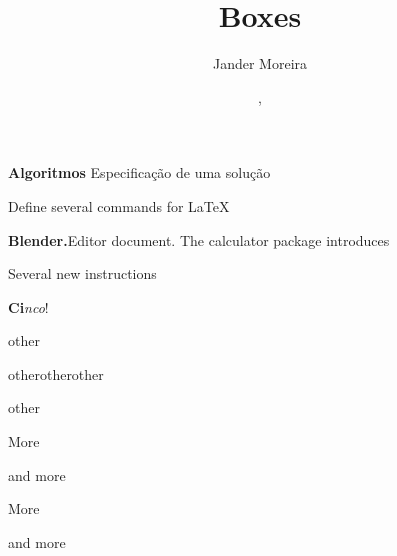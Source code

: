 \documentclass[12pt]{article}
\title{Boxes}
\author{Jander Moreira}
\date{\monthname, \the\year}
\begin{document}
\maketitle

\begin{mybox}[columns = 3, equal height = rows, palette = Two]
    \item %
    \textbf{Algoritmos}\newline
    Especificação de uma solução
    \item %
    Define several commands for \LaTeX
    \item \textbf{Blender.}\newline Editor document. The calculator package introduces
    \item Several new instructions
    \item \textbf{Ci}\textit{nco}!
    \item other
    \item other\newline other\newline other
    \item other
\end{mybox}

\begin{mybox}[continued, columns = 3, palette = Two]
    \item More
    \item <2> and more
    \item More
    \item and more
\end{mybox}
\end{document}
